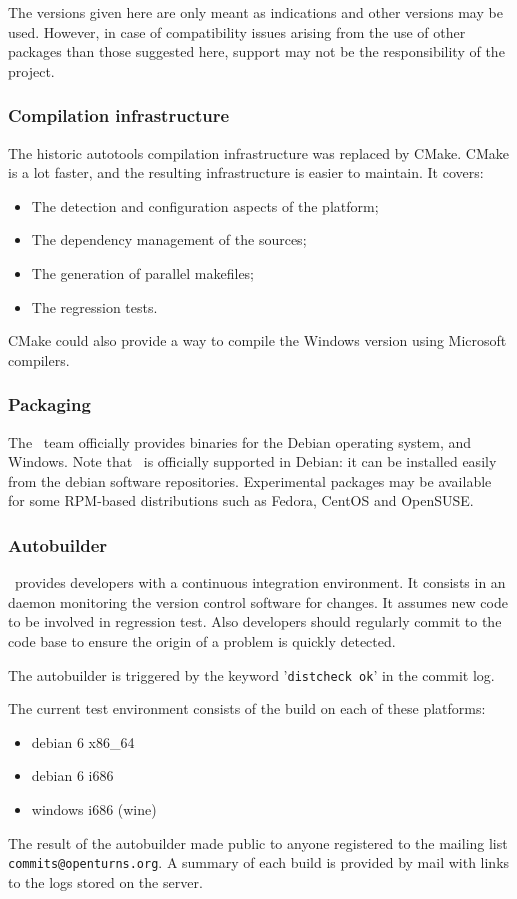 The versions given here are only meant as indications and other versions may be used. However, in case of compatibility issues arising from the use of other packages than those suggested here, support may not be the responsibility of the project.

\subsubsection{Compilation infrastructure}

The historic autotools compilation infrastructure was replaced by CMake. CMake is a lot faster, and the resulting infrastructure is easier to maintain. It covers:
\begin{itemize}
\item The detection and configuration aspects of the platform;
\item The dependency management of the sources;
\item The generation of parallel makefiles;
\item The regression tests.
\end{itemize}
CMake could also provide a way to compile the Windows version using Microsoft compilers.

\subsubsection{Packaging}

The \OT\ team officially provides binaries for the Debian operating system, and Windows.
Note that \OT\ is officially supported in Debian: it can be installed easily from the debian software repositories.
Experimental packages may be available for some RPM-based distributions such as Fedora, CentOS and OpenSUSE.

\subsubsection{Autobuilder}

\OT\ provides developers with a continuous integration environment.
It consists in an daemon monitoring the version control software for changes.
It assumes new code to be involved in regression test.
Also developers should regularly commit to the code base to ensure the origin of a problem is quickly detected.

The autobuilder is triggered by the keyword '\verb|distcheck ok|' in the commit log.

The current test environment consists of the build on each of these platforms:
\begin{itemize}
\item debian 6 x86\_64
\item debian 6 i686
\item windows i686 (wine)
\end{itemize}
The result of the autobuilder made public to anyone registered to the mailing list \verb|commits@openturns.org|.
A summary of each build is provided by mail with links to the logs stored on the server.

